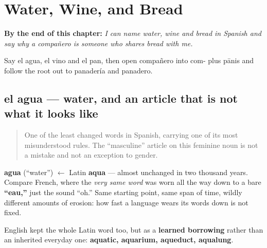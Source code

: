 
\chapter{Water, Wine, and Bread}
\label{ch:spanish-water-wine-bread}

\begin{chapteropening}
\textbf{By the end of this chapter:} \emph{I can name water, wine and bread in Spanish and say why a compañero is someone who shares bread with me.}

Say el agua, el vino and el pan, then open compañero into com- plus pānis and follow the root out to panadería and panadero.
\end{chapteropening}

\section[el agua]{el agua — water, and an article that is not what it looks like}

\label{lesson:ES-C26-agua}



\begin{quote}
One of the least changed words in Spanish, carrying one of its most misunderstood rules. The \textquotedblleft{}masculine\textquotedblright{} article on this feminine noun is not a mistake and not an exception to gender.
\end{quote}

\begin{cousinweb}
\textbf{agua} (\textquotedblleft{}water\textquotedblright{}) $\leftarrow$ Latin \textbf{aqua} — almost unchanged in two thousand years. Compare French, where the \emph{very same word} was worn all the way down to a bare \textbf{\textquotedblleft{}eau,\textquotedblright{}} just the sound \textquotedblleft{}oh.\textquotedblright{} Same starting point, same span of time, wildly different amounts of erosion: how fast a language wears its words down is not fixed.

English kept the whole Latin word too, but as a \textbf{learned borrowing} rather than an inherited everyday one: \textbf{aquatic, aquarium, aqueduct, aqualung}.
\end{cousinweb}

